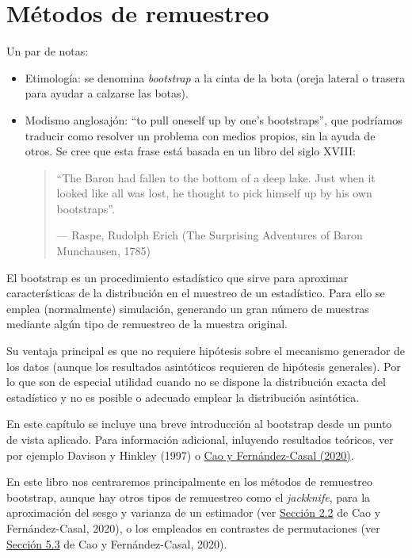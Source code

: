 \documentclass[
]{book}
\theoremstyle{break}
\theoremstyle{nonumberplain}
\begin{document}
\hypertarget{bootstrap}{%
\chapter{Métodos de remuestreo}\label{bootstrap}}

Un par de notas:

\begin{itemize}
\item
  Etimología: se denomina \emph{bootstrap} a la cinta de la bota (oreja lateral o trasera para ayudar a calzarse las botas).
\item
  Modismo anglosajón: ``to pull oneself up by one's bootstraps'', que podríamos traducir como resolver un problema con medios propios, sin la ayuda de otros.
  Se cree que esta frase está basada en un libro del siglo XVIII:

  \begin{quote}
  ``The Baron had fallen to the bottom of a deep lake.
  Just when it looked like all was lost,
  he thought to pick himself up by his own bootstraps''.

  --- Raspe, Rudolph Erich (The Surprising Adventures of Baron Munchausen, 1785)
  \end{quote}
\end{itemize}

El bootstrap es un procedimiento estadístico que sirve para aproximar características de la distribución en el muestreo de un estadístico.
Para ello se emplea (normalmente) simulación, generando un gran número de muestras mediante algún tipo de remuestreo de la muestra original.

Su ventaja principal es que no requiere hipótesis sobre el mecanismo generador de los datos (aunque los resultados asintóticos requieren de hipótesis generales).
Por lo que son de especial utilidad cuando no se dispone la distribución exacta del estadístico y no es
posible o adecuado emplear la distribución asintótica.

En este capítulo se incluye una breve introducción al bootstrap desde un punto de vista aplicado.
Para información adicional, inluyendo resultados teóricos, ver por ejemplo Davison y Hinkley (1997) o \href{https://rubenfcasal.github.io/book_remuestreo}{Cao y Fernández-Casal (2020)}.

En este libro nos centraremos principalmente en los métodos de remuestreo bootstrap, aunque hay otros tipos de remuestreo como el \emph{jackknife}, para la aproximación del sesgo y varianza de un estimador (ver \href{https://rubenfcasal.github.io/book_remuestreo/jackknife.html}{Sección 2.2} de Cao y Fernández-Casal, 2020), o los empleados en contrastes de permutaciones (ver \href{https://rubenfcasal.github.io/book_remuestreo/contrastes-de-permutaciones.html}{Sección 5.3} de Cao y Fernández-Casal, 2020).
\end{document}
